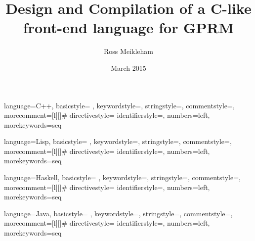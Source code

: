 \documentclass{l4proj}
\begin{document}
\makeatletter
{} {language=C++,
                basicstyle=%
                \ttfamily
                \lst@ifdisplaystyle\scriptsize\fi,
                keywordstyle=\color{blue}\ttfamily,
                stringstyle=\color{red}\ttfamily,
                commentstyle=\color{gray}\ttfamily,
                morecomment=[l][\color{magenta}]{\#}
                directivestyle={\color{green}}
                identifierstyle=\color{purple},
                numbers=left,
                morekeywords={seq}
}
\makeatother



\makeatletter
{} {language=Lisp,
                basicstyle=%
                \ttfamily
                \lst@ifdisplaystyle\scriptsize\fi,
                keywordstyle=\color{blue}\ttfamily,
                stringstyle=\color{red}\ttfamily,
                commentstyle=\color{gray}\ttfamily,
                morecomment=[l][\color{magenta}]{\#}
                directivestyle={\color{green}}
                identifierstyle=\color{purple},
                numbers=left,
                morekeywords={seq}
}
\makeatother


\makeatletter
{} {language=Haskell,
                basicstyle=%
                \ttfamily
                \lst@ifdisplaystyle\scriptsize\fi,
                keywordstyle=\color{blue}\ttfamily,
                stringstyle=\color{red}\ttfamily,
                commentstyle=\color{gray}\ttfamily,
                morecomment=[l][\color{magenta}]{\#}
                directivestyle={\color{green}}
                identifierstyle=\color{purple},
                numbers=left,
                morekeywords={seq}
}
\makeatother


\makeatletter
{} {language=Java,
                basicstyle=%
                \ttfamily
                \lst@ifdisplaystyle\scriptsize\fi,
                keywordstyle=\color{blue}\ttfamily,
                stringstyle=\color{red}\ttfamily,
                commentstyle=\color{gray}\ttfamily,
                morecomment=[l][\color{magenta}]{\#}
                directivestyle={\color{green}}
                identifierstyle=\color{purple},
                numbers=left,
                morekeywords={seq}
}
\makeatother


\title{Design and Compilation of a C-like front-end language for GPRM}
\author{Ross Meikleham}
\date{March 2015}
\maketitle
\end{document}
